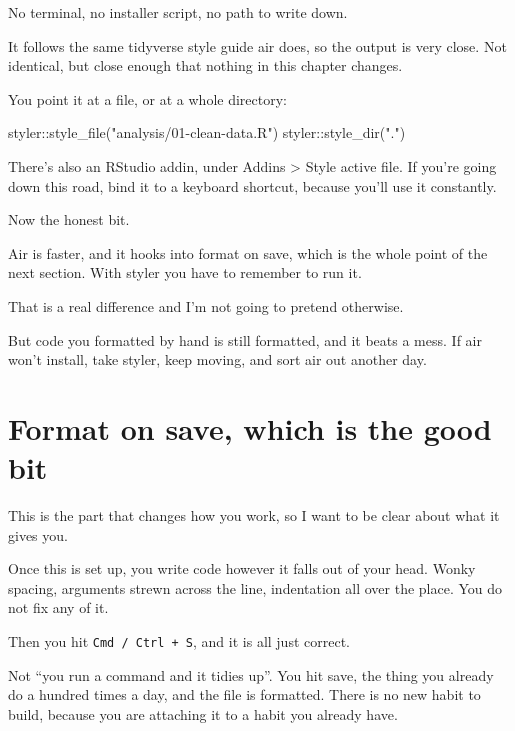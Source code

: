 \documentclass[
  letterpaper,
  justified,
  a4paper]{tufte-book}
\makeatletter
\newenvironment{Shaded}{\begin{snugshade}}{\end{snugshade}}
\newcommand{\FunctionTok}[1]{\textcolor[rgb]{0.28,0.35,0.67}{#1}}
\newcommand{\NormalTok}[1]{\textcolor[rgb]{0.00,0.23,0.31}{#1}}
\newcommand{\SpecialCharTok}[1]{\textcolor[rgb]{0.37,0.37,0.37}{#1}}
\newcommand{\StringTok}[1]{\textcolor[rgb]{0.13,0.47,0.30}{#1}}
\let\rbporigShaded\Shaded
\let\rbporigendShaded\endShaded
\renewenvironment{Shaded}{%
  \begingroup
  \ifdim\linewidth=\rbpbodywidth
    \advance\linewidth by \@tufte@overhang
    \advance\hsize by \@tufte@overhang
    \advance\columnwidth by \@tufte@overhang
  \fi
  \rbporigShaded
}{%
  \rbporigendShaded
  \endgroup
}
\makeatother
\begin{document}
No terminal, no installer script, no path to write down.

It follows the same tidyverse style guide air does, so the output is
very close. Not identical, but close enough that nothing in this chapter
changes.

You point it at a file, or at a whole directory:

\begin{Shaded}
\begin{Highlighting}[]
\NormalTok{styler}\SpecialCharTok{::}\FunctionTok{style\_file}\NormalTok{(}\StringTok{"analysis/01{-}clean{-}data.R"}\NormalTok{)}
\NormalTok{styler}\SpecialCharTok{::}\FunctionTok{style\_dir}\NormalTok{(}\StringTok{"."}\NormalTok{)}
\end{Highlighting}
\end{Shaded}

There's also an RStudio addin, under Addins \textgreater{} Style active
file. If you're going down this road, bind it to a keyboard shortcut,
because you'll use it constantly.

Now the honest bit.

Air is faster, and it hooks into format on save, which is the whole
point of the next section. With styler you have to remember to run it.

That is a real difference and I'm not going to pretend otherwise.

But code you formatted by hand is still formatted, and it beats a mess.
If air won't install, take styler, keep moving, and sort air out another
day.

\section{Format on save, which is the good
bit}\label{format-on-save-which-is-the-good-bit}

This is the part that changes how you work, so I want to be clear about
what it gives you.

Once this is set up, you write code however it falls out of your head.
Wonky spacing, arguments strewn across the line, indentation all over
the place. You do not fix any of it.

Then you hit \texttt{Cmd\ /\ Ctrl\ +\ S}, and it is all just correct.

Not ``you run a command and it tidies up''. You hit save, the thing you
already do a hundred times a day, and the file is formatted. There is no
new habit to build, because you are attaching it to a habit you already
have.
\end{document}
